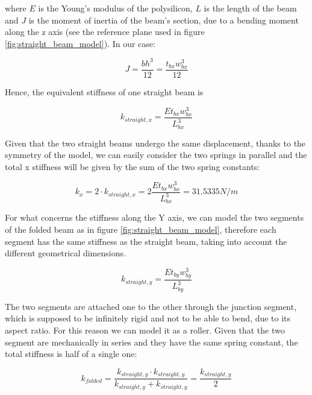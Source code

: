 \documentclass[lettersize,journal]{IEEEtran}
\begin{document}
        where \(E\) is the Young's modulus of the polysilicon, \(L\) is the length of the beam and \(J\) is the moment of inertia of the beam's section, due to a bending moment along the z axis (see the reference plane used in figure \ref{fig:straight_beam_model}). In our case:
        
        \begin{equation}\label{eq:j_straight}
            J=\frac{bh^3}{12}=\frac{t_{bx}w^3_{bx}}{12}
        \end{equation}
        
        Hence, the equivalent stiffness of one straight beam is
        
        \begin{equation}\label{eq:straight_beam_k_x}
            k_{straight,x} = \frac{Et_{bx}w^3_{bx}}{L^3_{bx}}
        \end{equation}
        
        Given that the two straight beams undergo the same displacement, thanks to the symmetry of the model, we can easily consider the two springs in parallel and the total x stiffness will be given by the sum of the two spring constants:
        
        \begin{equation}\label{eq:k_x}
            k_x = 2\cdot k_{straight,x}=2\frac{Et_{bx}w^3_{bx}}{L^3_{bx}}=31.5335N/m
        \end{equation}
        
        For what concerns the stiffness along the Y axis, we can model the two segments of the folded beam as in figure \ref{fig:straight_beam_model}, therefore each segment has the same stiffness as the straight beam, taking into account the different geometrical dimensions.
        
        \begin{equation}\label{eq:straight_beam_k_y}
            k_{straight,y} = \frac{Et_{by}w^3_{by}}{L^3_{by}}
        \end{equation}
        
        The two segments are attached one to the other through the junction segment, which is supposed to be infinitely rigid and not to be able to bend, due to its aspect ratio. For this reason we can model it as a roller. Given that the two segment are mechanically in series and they have the same spring constant, the total stiffness is half of a single one:
        
        \begin{equation}\label{eq:folded_k}
            k_{folded}=\frac{k_{straight,y}\cdot k_{straight,y}}{k_{straight,y}+k_{straight,y}}=\frac{k_{straight,y}}{2}
        \end{equation}
        
\end{document}
